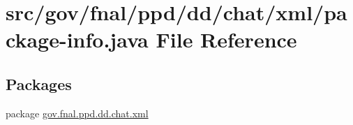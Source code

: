 \hypertarget{dd_2chat_2xml_2package-info_8java}{\section{src/gov/fnal/ppd/dd/chat/xml/package-\/info.java File Reference}
\label{dd_2chat_2xml_2package-info_8java}
}
\subsection*{Packages}
\begin{DoxyCompactItemize}
\item 
package \hyperlink{namespacegov_1_1fnal_1_1ppd_1_1dd_1_1chat_1_1xml}{gov.\-fnal.\-ppd.\-dd.\-chat.\-xml}
\end{DoxyCompactItemize}
